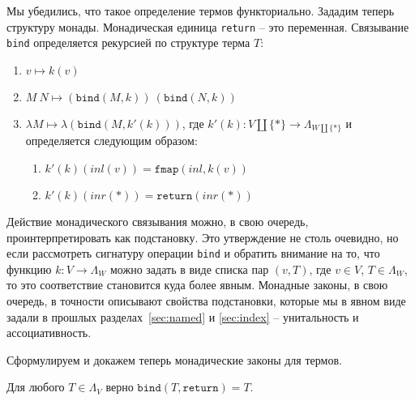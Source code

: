Мы убедились, что такое определение термов функториально. Зададим теперь структуру монады. Монадическая единица \texttt{return} -- это переменная. Связывание \texttt{bind} определяется рекурсией по структуре терма $T$:

\begin{enumerate}
  \item $v \mapsto k(v)$
  \item $M\ N \mapsto (\texttt{bind}(M, k))\ (\texttt{bind}(N, k))$
  \item $\lambda M \mapsto \lambda(\texttt{bind}(M, k'(k)))$, где $k'(k) : V \coprod \{*\} \to \Lambda_{W \coprod \{*\}}$ и определяется следующим образом:
    \begin{enumerate}
      \item $k'(k)(inl(v)) = \texttt{fmap}(inl, k(v))$
      \item $k'(k)(inr(*)) = \texttt{return}(inr(*))$
    \end{enumerate}
\end{enumerate}

Действие монадического связывания можно, в свою очередь, проинтерпретировать как подстановку. Это утверждение не столь очевидно, но если рассмотреть сигнатуру операции \texttt{bind} и обратить внимание на то, что функцию $k : V \to \Lambda_{W}$ можно задать в виде списка пар $(v, T)$, где $v \in V$, $T \in \Lambda_{W}$, то это соответствие становится куда более явным. Монадные законы, в свою очередь, в точности описывают свойства подстановки, которые мы в явном виде задали в прошлых разделах~\ref{sec:named} и \ref{sec:index} -- унитальность и ассоциативность.

Сформулируем и докажем теперь монадические законы для термов.

\begin{prop}
  \label{monad:bind-right-unit}
  Для любого $T \in \Lambda_{V}$ верно $\texttt{bind}(T, \texttt{return}) = T$.
\end{prop}

